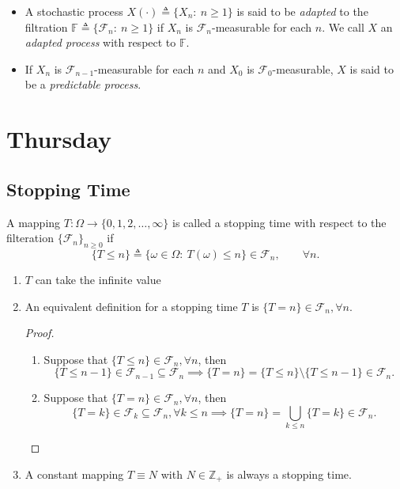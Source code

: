 \begin{definition}
\begin{itemize}
\item
A stochastic process $X(\cdot)\triangleq \{X_n:~n\ge1\}$ is said to be \emph{adapted} to the 
filtration $\mathbb{F}\triangleq \{\mathcal{F}_n:~n\ge1\}$ if $X_n$ is $\mathcal{F}_n$-measurable for each $n$.
We call $X$ an \emph{adapted process} with respect to $\mathbb{F}$.
\item
If $X_n$ is $\mathcal{F}_{n-1}$-measurable for each $n$ and $X_0$ is $\mathcal{F}_0$-measurable, $X$ is said to be a \emph{predictable process}.
\end{itemize}
\end{definition}



\section{Thursday}

\subsection{Stopping Time}


\begin{definition}
A mapping $T:\Omega\to\{0,1,2,\ldots,\infty\}$ is called a stopping time with respect to the filteration 
$\{\mathcal{F}_n\}_{n\ge0}$ if
\[
\{T\le n\}\triangleq
\{\omega\in\Omega:~T(\omega)\le n\}\in\mathcal{F}_n,\qquad\forall n.
\]
\end{definition}
\begin{remark}
\begin{enumerate}
\item
$T$ can take the infinite value 
\item
An equivalent definition for a stopping time $T$ is $\{T= n\}\in\mathcal{F}_n,\forall n$.
\begin{proof}
\begin{enumerate}
\item
Suppose that $\{T\le n\}\in\mathcal{F}_n,\forall n$, then
\[
\{T\le n-1\}\in\mathcal{F}_{n-1}\subseteq \mathcal{F}_n
\implies
\{T= n\}=\{T\le n\}\setminus \{T\le n-1\}\in\mathcal{F}_n.
\]
\item
Suppose that $\{T= n\}\in\mathcal{F}_n,\forall n$, then
\[
\{T= k\}\in\mathcal{F}_k\subseteq \mathcal{F}_n,\forall k\le n
\implies
\{T= n\}=\bigcup_{k\le n}\{T= k\}\in\mathcal{F}_n.
\]
\end{enumerate}
\end{proof}
\item
A constant mapping $T\equiv N$ with $N\in\mathbb{Z}_+$ is always a stopping time.
\end{enumerate}
\end{remark}

